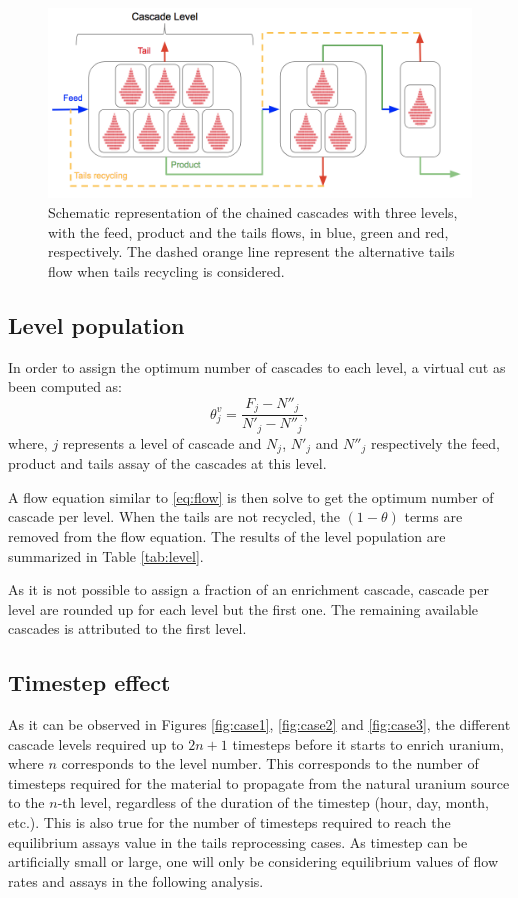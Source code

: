 \begin{figure}[ht] %
    \centering
    \includegraphics[scale=0.45]{flow}
    \caption{Schematic representation of the chained cascades with three levels,
    with the feed, product and the tails flows, in blue, green and red,
    respectively. The dashed orange line represent the alternative tails flow when
    tails recycling is considered.}
    \label{fig:cascade_level}
\end{figure}


\subsection{Level population}
In order to assign the optimum number of cascades to each level, a virtual cut as
been computed as:
\begin{equation}
    \theta^{v}_{j} = \frac{F_{j}-N''_{j}}{N'_{j}-N''_{j}},
\end{equation}
where, $j$ represents a level of cascade and $N_{j}$, $N'_{j}$ and $N''_{j}$
respectively the feed, product and tails assay of the cascades at this level.

A flow equation similar to \eqref{eq:flow} is then solve to get the optimum
number of cascade per level. When the tails are not recycled, the $(1-\theta)$
terms are removed from the flow equation.  The results of the level population
are summarized in Table \ref{tab:level}.

As it is not possible to assign a fraction of an enrichment cascade, cascade per
level are rounded up for each level but the first one. The remaining available
cascades is attributed to the first level.


\subsection{Timestep effect}

As it can be observed in Figures \ref{fig:case1}, \ref{fig:case2} and
\ref{fig:case3}, the different cascade levels required up to $2n+1$ timesteps
before it starts to enrich uranium, where $n$ corresponds to the level number.
This corresponds to the number of timesteps required for the material to
propagate from the natural uranium source to the $n$-th level, regardless of the
duration of the timestep (hour, day, month, etc.). This is also true for the
number of timesteps required to reach the equilibrium assays value in the tails
reprocessing cases.  As timestep can be artificially small or large, one will
only be considering equilibrium values of flow rates and assays in the following
analysis.
